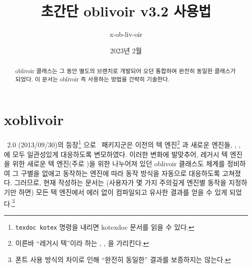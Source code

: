 \documentclass[
	12pt,
	a4paper,
	kosection,
	footnote,
	nobookmarks,
	microtype,
	figtabcapt,
]{oblivoir}
\newcommand\xobclass{x\-ob\-liv\-oir\oblivoirallowbreak}
\newcommand\obclass{ob\-liv\-oir\oblivoirallowbreak}
\begin{document}
\title{초간단 \obclass{} v3.2 사용법}

\date{2023년 2월}

\author{x-ob-liv-oir}

\maketitle

\begin{abstract}
\obclass{} 클래스는 그 동안 별도의 브랜치로 개발되어 오던
  통합하여 완전히 동일한 클래스가 되었다.
이 문서는 \obclass{} 즉 
사용하는 방법을 간략히 기술한다.
\end{abstract}

\tableofcontents*

\clearpage

\section{ \xobclass{}}


\koTeX\ 2.0 (2013/09/30)의 등장\footnote{%
	\texttt{texdoc kotex} 명령을 내리면 kotexdoc 문서를 읽을 수 있다.}%
으로 \koTeX\ 패키지군은 이전의 텍 엔진\footnote{%
	이른바 ``레거시 텍''이라 하는 , , 을
	가리킨다.}%
과 새로운 엔진들, , ,
에 모두 일관성있게 대응하도록 변모하였다.
이러한 변화에 발맞추어, 레거시 텍 엔진을 위한  새로운 텍 엔진(주로 )을 위한 
나누어져 있던 oblivoir 클래스도 체계를 정비하여 그 구별을 없애고 동작하는 엔진에 따라 동작 방식을
자동으로 대응하도록 고쳐졌다. 그러므로, 현재  작성하는 문서는 
(사용자가 몇 가지 주의깊게 엔진별 동작을 지정하기만 하면) 모든 텍 엔진에서 에러 없이 컴파일되고
유사한 결과를 얻을 수 있게 되었다.\footnote{%
	폰트 사용 방식의 차이로 인해 ``완전히 동일한'' 결과를 보증하지는 않는다.}
\end{document}
